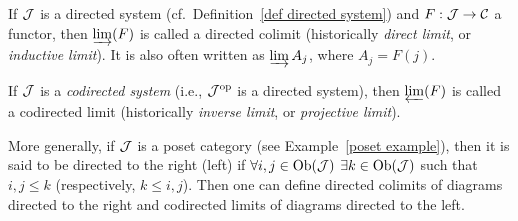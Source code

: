 \begin{defn}
    If $\mathcal{J}$ is a directed system (cf.\ Definition~\ref{def directed system}) and $F:\mathcal{J}\to \mathcal{C}$ a functor, then $\varinjlim(F)$ is called a directed colimit (historically \emph{direct limit}, or \emph{inductive limit}).  It is also often written as $\varinjlim A_j$, where $A_j=F(j)$. 
    
    If $\mathcal{J}$ is a \emph{codirected system}  (i.e., $\mathcal{J}^{\mathrm{op}}$ is a directed system), then $\varprojlim(F)$ is called a codirected limit (historically \emph{inverse limit}, or \emph{projective limit}). 
    
    More generally, if $\mathcal{J}$ is a poset category (see Example~\ref{poset example}), then it is said to be directed to the right (left) if $\forall i,j\in \operatorname{Ob}(\mathcal{J})$ $\exists k\in \operatorname{Ob}(\mathcal{J})$ such that $i,j\leq k$ (respectively, $k\leq i,j$). Then one can define directed colimits of diagrams directed to the right and codirected limits of diagrams directed to the left.
\end{defn}


